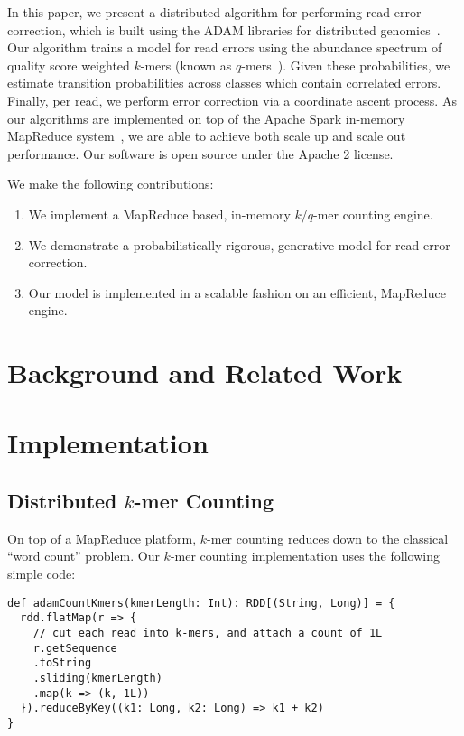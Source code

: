\documentclass{llncs}
\begin{document}
In this paper, we present a distributed algorithm for performing read error correction, which is built using
the ADAM libraries for distributed genomics~\cite{massie13}. Our algorithm trains a model for read
errors using the abundance spectrum of quality score weighted $k$-mers (known as
$q$-mers~\cite{kelley10}). Given these probabilities, we estimate transition probabilities across classes
which contain correlated errors. Finally, per read, we perform error correction via a coordinate ascent
process. As our algorithms are implemented on top of the Apache Spark in-memory MapReduce
system~\cite{zaharia10}, we are able to achieve both scale up and scale out performance. Our
software is open source under the Apache 2 license.

We make the following contributions:

\begin{enumerate}
\item We implement a MapReduce based, in-memory $k$/$q$-mer counting engine.
\item We demonstrate a probabilistically rigorous, generative model for read error correction.
\item Our model is implemented in a scalable fashion on an efficient, MapReduce engine.
\end{enumerate}

\section{Background and Related Work}
\label{sec:background}

\section{Implementation}
\label{sec:implementation}

\subsection{Distributed $k$-mer Counting}
\label{sec:distributed-kmer-counting}

On top of a MapReduce platform, $k$-mer counting reduces down to the classical ``word count'' problem.
Our $k$-mer counting implementation uses the following simple code:

\begin{lstlisting}
def adamCountKmers(kmerLength: Int): RDD[(String, Long)] = {
  rdd.flatMap(r => {
    // cut each read into k-mers, and attach a count of 1L                                                                                                                                                  
    r.getSequence
	.toString
	.sliding(kmerLength)
	.map(k => (k, 1L))
  }).reduceByKey((k1: Long, k2: Long) => k1 + k2)
}
\end{lstlisting}
\end{document}
